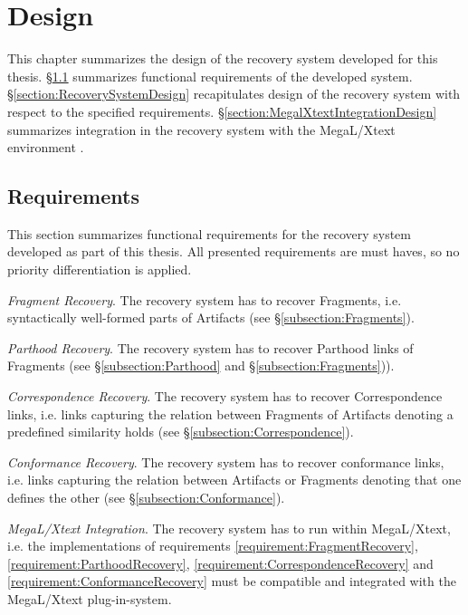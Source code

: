 \chapter{Design}
\label{chapter:Design}
This chapter summarizes the design of the recovery system developed for this thesis.
§\ref{section:Requirements} summarizes functional requirements of the developed system.
§\ref{section:RecoverySystemDesign} recapitulates design of the recovery system with respect to the specified requirements.
§\ref{section:MegalXtextIntegrationDesign} summarizes integration in the recovery system with the \gls{MegaL/Xtext} environment .

\section{Requirements}
\label{section:Requirements}
This section summarizes functional requirements for the recovery system developed as part of this thesis.
All presented requirements are must haves, so no priority differentiation is applied. 

\begin{requirements}

\item
\label{requirement:FragmentRecovery}
\textit{Fragment Recovery}.
The recovery system has to recover \glspl{Fragment}, i.e. syntactically well-formed parts of \glspl{Artifact} (see §\ref{subsection:Fragments}).

\item
\label{requirement:ParthoodRecovery}
\textit{Parthood Recovery}.
The recovery system has to recover \gls{Parthood} links of \glspl{Fragment} (see §\ref{subsection:Parthood} and §\ref{subsection:Fragments})).

\item
\label{requirement:CorrespondenceRecovery}
\textit{Correspondence Recovery}.
The recovery system has to recover \gls{Correspondence} links, i.e. links capturing the relation between \glspl{Fragment} of \glspl{Artifact} denoting a predefined similarity holds (see §\ref{subsection:Correspondence}).

\item
\label{requirement:ConformanceRecovery} 
\textit{Conformance Recovery}.
The recovery system has to recover conformance links, i.e. links capturing the relation between \glspl{Artifact} or \glspl{Fragment} denoting that one defines the other (see §\ref{subsection:Conformance}).

\item 
\label{Requirement:Megal-Xtext}
\textit{\gls{MegaL/Xtext} Integration}.
The recovery system has to run within \gls{MegaL/Xtext}, i.e. the implementations of requirements 
\ref{requirement:FragmentRecovery},
\ref{requirement:ParthoodRecovery}, 
\ref{requirement:CorrespondenceRecovery} 
and \ref{requirement:ConformanceRecovery} must be compatible and integrated with the \gls{MegaL/Xtext} plug-in-system.

\end{requirements}

